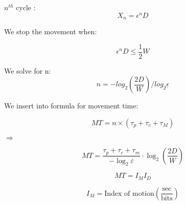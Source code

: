 $n^{th}$ cycle :
$$X_n = \epsilon^n D $$

We stop the movement when:

$$\epsilon^n D \leq \frac{1}{2} W$$

We solve for n:
$$ n = -log_2(\frac{2D}{W})/log_2\epsilon$$

We insert into formula for movement time: 

$$MT = n \times (\tau_p + \tau_c + \tau_M)$$

$\Rightarrow$

$$ MT = \frac{\tau_p + \tau_c + \tau_m}{-\log_{2} \varepsilon} \cdot \log_{2} \left( \frac{2D}{W} \right) $$

$$ MT = I_M I_D $$

$$ I_M = \text{Index of motion} \left( \frac{\text{sec}}{\text{bits}} \right) $$


\columnbreak























